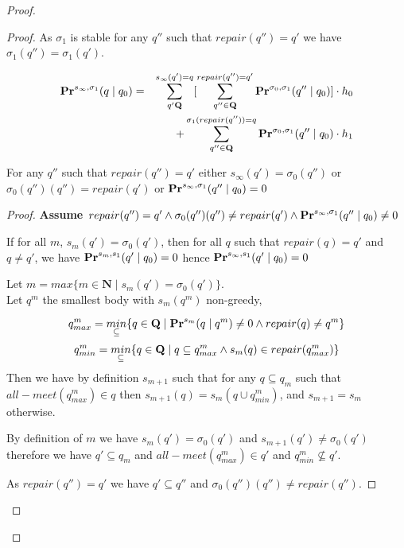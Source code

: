 \begin{proof}
\begin{proof}
		As $\sigma_1$ is stable for any $q''$ such that $repair(q'') = q'$ we have $\sigma_1(q'') = \sigma_1(q')$.
		
		\begin{eqnarray*}
			\mathbf{Pr}^{s_{\infty},\sigma_1}(q \mid q_0)  & =& \sum_{q' \mathbf{Q}}^{s_{\infty}(q') = q} [ \sum_{q''\in \mathbf{Q}}^{repair(q'') = q'} \mathbf{Pr}^{\sigma_0,\sigma_1}(q'' \mid q_0)] \cdot h_0\\
			& & +  \sum_{q''\in \mathbf{Q}}^{\sigma_1(repair(q'')) = q} \mathbf{Pr}^{\sigma_0,\sigma_1}(q'' \mid q_0) \cdot h_1\\
		\end{eqnarray*}
		
		\begin{mylem}
			\label{lemmarep}
			For any $q''$ such that $repair(q'') = q'$ either $s_{\infty}(q') = \sigma_0(q'')$ or $\sigma_0(q'')(q'') = repair(q')$ or $\mathbf{Pr}^{s_{\infty},\sigma_1}(q'' \mid q_0) = 0$
		\end{mylem}
		\begin{proof}
			
			\textbf{Assume $repair(q'') = q'  \land \sigma_0(q'')(q'') \neq repair(q') \land \mathbf{Pr}^{s_{\infty},\sigma_1}(q'' \mid q_0) \neq 0$}
			
			If for all $m$, $s_m(q') = \sigma_0(q')$, then for all $q$ such that $repair(q) = q'$ and $q \neq q'$, we have $\mathbf{Pr}^{s_{m},s_1}(q' \mid q_0) = 0$ hence $\mathbf{Pr}^{s_{\infty},s_1}(q' \mid q_0) = 0$
			
			Let $m = max \{m \in \mathbf{N} \mid s_m(q') = \sigma_0(q') \}$.
			\\Let $q^m$  the smallest body with $s_m(q^m)$ non-greedy, 
			
			$$q^m_{max} = \underset{\subseteq}{min}\{q \in \mathbf{Q} \mid  \mathbf{Pr}^{s_m}(q\mid q^m)\neq 0 \land repair(q) \neq q^m \}$$
			$$q^m_{min} = \underset{\subseteq}{min}\{q \in \mathbf{Q} \mid  q \subseteq q^m_{max} \land s_m(q) \in repair(q^m_{max}) \}$$
			Then we have by definition $s_{m+1}$ such that for any $q \subseteq q_m$ such that $all-meet(q^m_{max}) \in q$ then $s_{m+1}(q) = s_m(q \cup q^m_{min})$, and $s_{m+1} = s_m$ otherwise.
			
			
			
			By definition of $m$ we have $s_m(q') = \sigma_0(q')$ and $s_{m+1}(q') \neq \sigma_0(q')$ therefore we have $q' \subseteq q_m$ and $all-meet(q^m_{max}) \in q'$ and $q^m_{min} \not \subseteq q'$. 
			
			As $repair(q'') = q'$ we have $q' \subseteq q''$ and $\sigma_0(q'')(q'') \neq repair(q'')$.
			

\end{proof}
\end{proof}
\end{proof}

